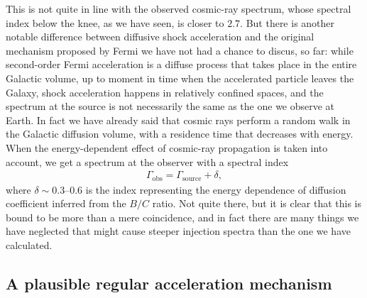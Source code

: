 This is not quite in line with the observed cosmic-ray spectrum, whose spectral
index below the knee, as we have seen, is closer to $2.7$. But there is another
notable difference between diffusive shock acceleration and the original mechanism
proposed by Fermi we have not had a chance to discus, so far: while second-order
Fermi acceleration is a diffuse process that takes place in the entire Galactic
volume, up to moment in time when the accelerated particle leaves the Galaxy,
shock acceleration happens in relatively confined spaces, and the spectrum at the
source is not necessarily the same as the one we observe at Earth. In fact we have
already said that cosmic rays perform a random walk in the Galactic diffusion volume,
with a residence time that decreases with energy. When the energy-dependent effect
of cosmic-ray propagation is taken into account, we get a spectrum at the observer
with a spectral index
\begin{align}
  \Gamma_\text{obs} = \Gamma_\text{source} + \delta,
\end{align}
where $\delta \sim 0.3$--$0.6$ is the index representing the energy dependence of
diffusion coefficient inferred from the $B/C$ ratio. Not quite there, but it is
clear that this is bound to be more than a mere coincidence, and in fact there are
many things we have neglected that might cause steeper injection spectra than the
one we have calculated.



\subsection{A plausible regular acceleration mechanism}

